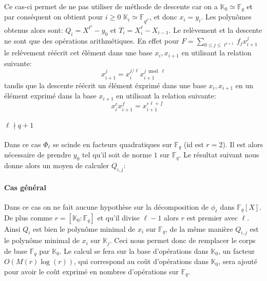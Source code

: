 \documentclass[10pt,a4paper]{book}
\theoremstyle{plain}
\theoremstyle{definition}
\theoremstyle{definition}
\theoremstyle{definition}
\newtheorem{prop}[thm]{Proposition}
\theoremstyle{definition}
\theoremstyle{remark}
\theoremstyle{remark}
\begin{document}
Ce cas-ci permet de ne pas utiliser de méthode de descente car on a $\mathbb{K}_0 \simeq \mathbb{F}_q$ et par conséquent on obtient pour $i \geqslant 0 $   $\mathbb{K}_i \simeq \mathbb{F}_{q^{\ell^i}}$, et donc $x_i=y_i$. Les polynômes obtenus alors sont: $Q_i=X^{\ell^i}-y_0$ et $T_i=X_i^{\ell}-X_{i-1}$. Le relèvement et la descente ne sont que des opérations arithmétiques. En effet pour $F=\sum_{0 \leqslant j \leqslant \ell^{i+1}}f_jx_{i+1}^j$ le relévement réécrit cet élément dans une base $x_i,x_{i+1}$ en utilisant la relation suivante:
\begin{equation*}
x_{i+1}^j=x_i^{j / \ell}x_{i+1}^{j \bmod \ell} 
\end{equation*}
tandis que la descente réécrit un élément éxprimé dans une base $x_i, x_{i+1}$ en un élément exprimé dans la base $x_{i+1}$ en utilisant la relation suivante:
\begin{equation*}
\quad x_i^ex_{i+1}^f=x_{i+1}^{e\ell + f} 
\end{equation*}

\paragraph{$\ell \nmid q+1$}
Dans ce cas $\Phi_{\ell}$ se scinde en facteurs quadratiques sur $\mathbb{F}_q$ (id est $r=2$). Il est alors nécessaire de prendre $y_0$ tel qu'il soit de norme $1$ sur $\mathbb{F}_q$. Le résultat suivant nous donne alors un moyen de calculer $Q_{i,j}$:
%

\paragraph{Cas général}
Dans ce cas on ne fait aucune hypothèse sur la décomposition de $\phi_{\ell}$ dans $\mathbb{F}_q[X]$. De plus comme $r=[\mathbb{K}_0:\mathbb{F}_q]$ et qu'il divise $\ell-1$ alors $r$ est premier avec $\ell$. Ainsi $Q_i$ est bien le polynôme minimal de $x_i$ sur $\mathbb{F}_q$, de la même manière $Q_{i,j}$ est le polynôme minimal de $x_i$ sur $\mathbb{K}_j$. Ceci nous permet donc de remplacer le corps de base $\mathbb{F}_q$ par $\mathbb{K}_0$. Le calcul se fera sur la base d'opérations dans $\mathbb{K}_0$, un facteur $O(M(r)\log(r))$, qui correspond au coût d'opérations dans $\mathbb{K}_0$, sera ajouté pour avoir le coût exprimé en nombres d'opérations sur $\mathbb{F}_q$.
\end{document}
